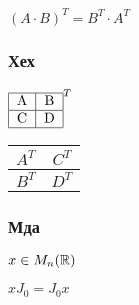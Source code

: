 $(A \cdot B)^T = B^T \cdot A^T$

\subsubsection{Хех}

$
\begin{tabular}{|c|c|}
    \hline
    A & B \\
    \hline
    C & D \\
    \hline
\end{tabular}^T
$

\begin{tabular}{|c|c|}
    \hline
    $A^T$ & $C^T$ \\
    \hline
    $B^T$ & $D^T$ \\
    \hline
\end{tabular}

\subsubsection{Мда}


$x \in M_n(\mathbb{R})$

$x J_0 = J_0 x$



